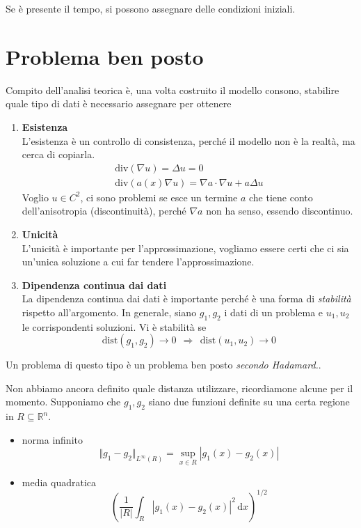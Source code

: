 \documentclass[10pt,a4paper,twoside,openright]{book}
\newcommand{\de}{\,\mathrm d}
\newcommand{\dx}{\de x}
\begin{document}
Se è presente il tempo, si possono assegnare delle condizioni iniziali.
\section{Problema ben posto}

Compito dell'analisi teorica è, una volta costruito il modello consono, stabilire quale tipo di dati è necessario assegnare per ottenere
\begin{enumerate}
	\item \textbf{Esistenza}\\
	L'esistenza è un controllo di consistenza, perché il modello non è la realtà, ma cerca di copiarla.
	\begin{gather*}
		\mathrm{div}(\nabla u) =\Delta u=0\\
		\mathrm{div}(a(x) \nabla u) =\nabla a\cdotp \nabla u+a\Delta u
	\end{gather*}
	Voglio $u\in C^{2}$, ci sono problemi se esce un termine $a$ che tiene conto dell'anisotropia (discontinuità), perché $\nabla a$ non ha senso, essendo discontinuo.

	\item \textbf{Unicità}\\
	L'unicità è importante per l'approssimazione, vogliamo essere certi che ci sia un'unica soluzione a cui far tendere l'approssimazione.

	\item \textbf{Dipendenza continua dai dati}\\
	La dipendenza continua dai dati è importante perché è una forma di \textit{stabilità} rispetto all'argomento. In generale, siano $g_{1},g_{2}$ i dati di un problema e $u_{1},u_{2}$ le corrispondenti soluzioni. Vi è stabilità se
	\begin{equation*}
		\text{dist}(g_{1},g_{2})\rightarrow 0\ \ \Rightarrow \ \ \text{dist}(u_{1},u_{2})\rightarrow 0
	\end{equation*}
\end{enumerate}

Un problema di questo tipo è un problema ben posto \textit{secondo Hadamard.}.

Non abbiamo ancora definito quale distanza utilizzare, ricordiamone alcune per il momento. Supponiamo che $g_{1},g_{2}$ siano due funzioni definite su una certa regione in $R\subseteq \mathbb{R}^{n}$.
\begin{itemize}
\item norma infinito
\begin{equation*}
\Vert g_{1} -g_{2}\Vert _{L^{\infty }(R)} =\sup _{x\in R}| g_{1}(x) -g_{2}(x)| 
\end{equation*}
\item media quadratica
\begin{equation*}
\left(\frac{1}{| R| }\int _{R}| g_{1}(x) -g_{2}(x)| ^{2} \dx\right)^{1/2}
\end{equation*}
\end{itemize}
\end{document}
